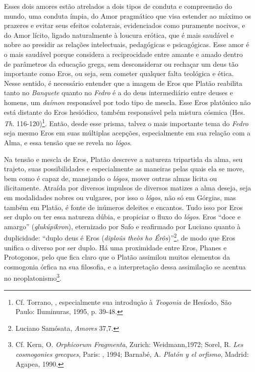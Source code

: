 Esses dois amores estão atrelados a dois tipos de conduta e compreensão
do mundo, uma conduta ímpia, do Amor pragmático que visa estender ao
máximo os prazeres e evitar seus efeitos colaterais, evidenciados como
puramente nocivos, e do Amor lícito, ligado naturalmente à loucura
erótica, que é mais saudável e nobre ao presidir as relações
intelectuais, pedagógicas e psicagógicas. Esse amor é o mais saudável
porque considera a reciprocidade entre amante e amado dentro de
parâmetros da educação grega, sem desconsiderar ou rechaçar um deus tão
importante como Eros, ou seja, sem cometer qualquer falta teológica e
ética. Nesse sentido, é necessário entender que a imagem de Eros que
Platão reabilita tanto no \emph{Banquete} quanto no \emph{Fedro} é a do
deus intermediário entre deuses e homens, um \emph{daímon} responsável
por todo tipo de mescla. Esse Eros platônico não está distante do Eros
hesiódico, também responsável pela mistura cósmica
(Hes. \emph{Th}. 116-120)\footnote{Cf. Torrano, , especialmente sua
  introdução à \emph{Teogonia} de Hesíodo, São Paulo: Iluminuras, 1995,
  p. 39-48.}. Então, desde esse prisma, talvez o mais importante tema
do \emph{Fedro} seja mesmo Eros em suas
múltiplas acepções, especialmente em sua relação com a Alma, e essa
tensão que se revela no \emph{lógos}.

Na tensão e mescla de Eros, Platão descreve a natureza tripartida da
alma, seu trajeto, suas possibilidades e especialmente as maneiras pelas
quais ela se move, bem como é capaz de, manejando o \emph{lógos}, mover
outras almas lícita ou ilicitamente. Atraída por diversos impulsos de
diversos matizes a alma deseja, seja em modalidades nobres ou
vulgares, por isso o \emph{lógos}, não só em Górgias, mas também em
Platão, é fonte de inúmeros deleites e encantos. Tudo isso por Eros ser
duplo ou ter essa natureza dúbia, e propiciar o fluxo do \emph{lógos}.
Eros ``doce e amargo'' (\emph{glukúpikron}), eternizado por Safo e
reafirmado por Luciano quanto à duplicidade: ``duplo deus é Eros
(\emph{diploûs theòs ho Érôs})''\footnote{Luciano Samósata,
  \emph{Amores} 37,7.}, de modo que Eros unifica o diverso por
ser duplo. Há uma proximidade entre Eros, Phanes e Protogonos, pelo que
fica claro que o Platão assimilou muitos elementos da cosmogonia órfica
na sua filosofia, e a interpretação dessa assimilação se acentua no
neoplatonismo\footnote{Cf. Kern, O. \emph{Orphicorum Fragmenta},
  Zurich: Weidmann,1972; Sorel, R. \emph{Les cosmogonies grecques},
  Paris: , 1994; Barnabé, A. \emph{Platón y el orfismo}, Madrid:
  Agapea, 1990.}.

